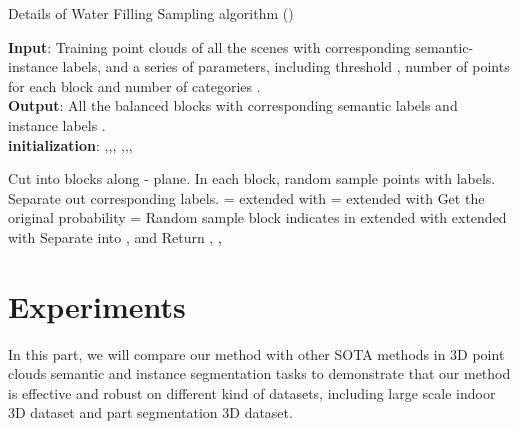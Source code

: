 \documentclass{cta-author}
\begin{document}
\begin{algorithm}
  \caption{Details of Water Filling Sampling algorithm ()}
  \textbf{Input}: Training point clouds of all the scenes  with corresponding semantic-instance labels, and a series of parameters, including threshold , number of points for each block  and number of categories .  \\
  \textbf{Output}: All the balanced blocks  with corresponding semantic labels  and instance labels .\\
  \textbf{initialization}: ,,,
  ,,,
  \begin{algorithmic}[1]
    \State Cut  into blocks  along - plane.
    \State In each block, random sample  points with labels.
    \State  Separate out corresponding labels.
    \State  = 
    \If { }
    \State  extended with 
    \State  
    \EndIf
    \EndFor
    \State  =  extended with 
    \EndFor
    \EndFor
    \State Get the original probability  = 
    \While{}
    \State 
    \State   
    \State   
    \State 
    \EndWhile
    \State 
    \State  Random sample  block indicates in 
    \State   extended with  
    \EndFor
    \State   extended with  
    \State Separate  into ,  and 
    \State Return , , 
  \end{algorithmic}
  \label{algorithm1}
\end{algorithm}
\section{Experiments}\label{sec4}
In this part, we will compare our method with other SOTA methods in 3D point clouds semantic and instance segmentation tasks to demonstrate that our method is effective and robust on different kind of datasets, including large scale indoor 3D dataset and part segmentation 3D dataset.
\end{document}
